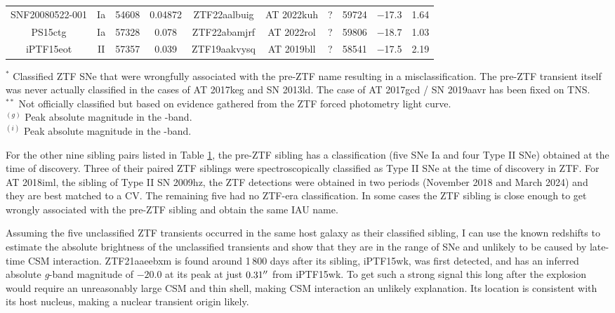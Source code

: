 \documentclass[a4paper,oneside,12pt, class=Latex/Classes/PhDthesisPSnPDF, crop=false]{standalone}
\begin{document}
\begin{table}[h!]
{\begin{tabular}{cccc|cccccc}
        SNF20080522-001 & Ia & 54608 & 0.04872 & ZTF22aalbuig & AT 2022kuh & ? & 59724 & $-$17.3 & 1.64 \\
        PS15ctg & Ia & 57328 & 0.078 & ZTF22abamjrf & AT 2022rol & ? & 59806 & $-$18.7 & 1.03 \\
        
        iPTF15eot & II & 57357 & 0.039 & ZTF19aakvysq & AT 2019bll & ? & 58541 & $-$17.5 & 2.19 \\
        \hline
    \end{tabular}
    }
    \begin{flushleft}
        $^*$ Classified ZTF SNe that were wrongfully associated with the pre-ZTF name resulting in a misclassification. The pre-ZTF transient itself was never actually classified in the cases of AT 2017keg and SN 2013ld. The case of AT 2017gcd / SN 2019aavr has been fixed on TNS.\\
        $^{**}$ Not officially classified but based on evidence gathered from the ZTF forced photometry light curve.\\
        $^{(g)}$ Peak absolute magnitude in the \ztfg-band.\\
        $^{(i)}$ Peak absolute magnitude in the \ztfi-band.\\
    \end{flushleft}
    \label{sibling_table}
\end{table}

For the other nine sibling pairs listed in Table \ref{sibling_table}, the pre-ZTF sibling has a classification (five SNe Ia and four Type II SNe) obtained at the time of discovery. Three of their paired ZTF siblings were spectroscopically classified as Type II SNe at the time of discovery in ZTF. For AT 2018iml, the sibling of Type II SN 2009hz, the ZTF detections were obtained in two periods (November 2018 and March 2024) and they are best matched to a CV. The remaining five had no ZTF-era classification. In some cases the ZTF sibling is close enough to get wrongly associated with the pre-ZTF sibling and obtain the same IAU name.

Assuming the five unclassified ZTF transients occurred in the same host galaxy as their classified sibling, I can use the known redshifts to estimate the absolute brightness of the unclassified transients and show that they are in the range of SNe and unlikely to be caused by late-time CSM interaction.
ZTF21aaeebxm is found around 1\,800 days after its sibling, iPTF15wk, was first detected, and has an inferred absolute \textit{g}-band magnitude of $-20.0$ at its peak at just $0.31^{\prime\prime}$ from iPTF15wk. To get such a strong signal this long after the explosion would require an unreasonably large CSM and thin shell, making CSM interaction an unlikely explanation. Its location is consistent with its host nucleus, making a nuclear transient origin likely.
\end{document}
